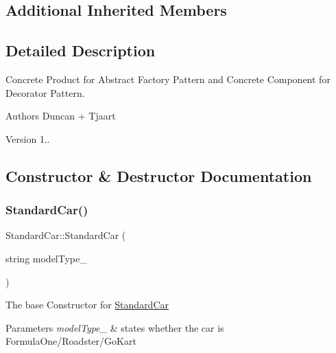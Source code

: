 \subsection*{Additional Inherited Members}


\subsection{Detailed Description}
Concrete Product for Abstract Factory Pattern and Concrete Component for Decorator Pattern. 

\begin{DoxyAuthor}{Authors}
Duncan + Tjaart 
\end{DoxyAuthor}
\begin{DoxyVersion}{Version}
1.. 
\end{DoxyVersion}


\subsection{Constructor \& Destructor Documentation}
\mbox{\label{class_standard_car_ae1b58891e1b5fa8c6697768e25583ba8}} 
\subsubsection{\texorpdfstring{Standard\+Car()}{StandardCar()}\hspace{0.1cm}{\footnotesize\ttfamily [1/2]}}
{\footnotesize\ttfamily Standard\+Car\+::\+Standard\+Car (\begin{DoxyParamCaption}\item[{string}]{model\+Type\+\_\+ }\end{DoxyParamCaption})}

The base Constructor for \mbox{\hyperlink{class_standard_car}{Standard\+Car}} 
\begin{DoxyParams}{Parameters}
{\em model\+Type\+\_\+} & states whether the car is Formula\+One/\+Roadster/\+Go\+Kart \\
\hline
\end{DoxyParams}
\mbox{\label{class_standard_car_af58be688bd401181b0d3fc91358c9431}} 

